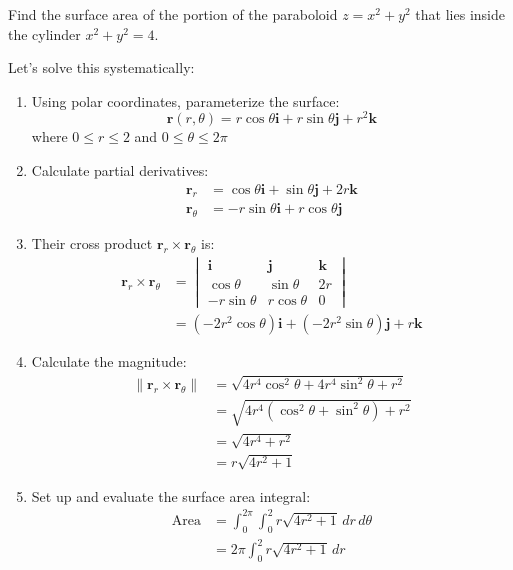 \exampleline
\begin{example}
Find the surface area of the portion of the paraboloid $z = x^2 + y^2$ that lies inside the cylinder $x^2 + y^2 = 4$.

\begin{solution}
Let's solve this systematically:

\begin{enumerate}
   \item Using polar coordinates, parameterize the surface:
   \[
   \mathbf{r}(r,\theta) = r\cos\theta\mathbf{i} + r\sin\theta\mathbf{j} + r^2\mathbf{k}
   \]
   where $0 \leq r \leq 2$ and $0 \leq \theta \leq 2\pi$
   
   \item Calculate partial derivatives:
   \begin{align*}
       \mathbf{r}_r &= \cos\theta\mathbf{i} + \sin\theta\mathbf{j} + 2r\mathbf{k} \\
       \mathbf{r}_\theta &= -r\sin\theta\mathbf{i} + r\cos\theta\mathbf{j}
   \end{align*}
   
   \item Their cross product $\mathbf{r}_r \times \mathbf{r}_\theta$ is:
   \begin{align*}
       \mathbf{r}_r \times \mathbf{r}_\theta &= \begin{vmatrix}
       \mathbf{i} & \mathbf{j} & \mathbf{k} \\
       \cos\theta & \sin\theta & 2r \\
       -r\sin\theta & r\cos\theta & 0
       \end{vmatrix} \\
       &= (-2r^2\cos\theta)\mathbf{i} + (-2r^2\sin\theta)\mathbf{j} + r\mathbf{k}
   \end{align*}
   
   \item Calculate the magnitude:
   \begin{align*}
       \|\mathbf{r}_r \times \mathbf{r}_\theta\| &= \sqrt{4r^4\cos^2\theta + 4r^4\sin^2\theta + r^2} \\
       &= \sqrt{4r^4(\cos^2\theta + \sin^2\theta) + r^2} \\
       &= \sqrt{4r^4 + r^2} \\
       &= r\sqrt{4r^2 + 1}
   \end{align*}
   
   \item Set up and evaluate the surface area integral:
   \begin{align*}
       \text{Area} &= \int_0^{2\pi} \int_0^2 r\sqrt{4r^2 + 1}\,dr\,d\theta \\
       &= 2\pi \int_0^2 r\sqrt{4r^2 + 1}\,dr
   \end{align*}
   

\end{enumerate}
\end{solution}
\end{example}

